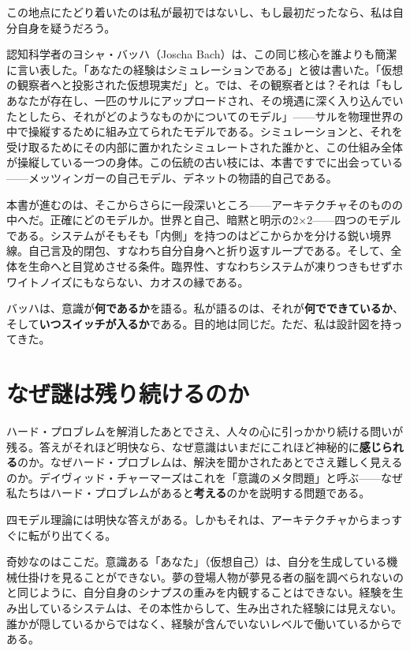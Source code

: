 \documentclass[11pt, twoside, openright]{book}
\begin{document}
この地点にたどり着いたのは私が最初ではないし、もし最初だったなら、私は自分自身を疑うだろう。

認知科学者のヨシャ・バッハ（Joscha Bach）は、この同じ核心を誰よりも簡潔に言い表した。「あなたの経験はシミュレーションである」と彼は書いた。「仮想の観察者へと投影された仮想現実だ」と。では、その観察者とは？それは「もしあなたが存在し、一匹のサルにアップロードされ、その境遇に深く入り込んでいたとしたら、それがどのようなものかについてのモデル」------サルを物理世界の中で操縦するために組み立てられたモデルである。シミュレーションと、それを受け取るためにその内部に置かれたシミュレートされた誰かと、この仕組み全体が操縦している一つの身体。この伝統の古い枝には、本書ですでに出会っている------メッツィンガーの自己モデル、デネットの物語的自己である。

本書が進むのは、そこからさらに一段深いところ------アーキテクチャそのものの中へだ。正確にどのモデルか。世界と自己、暗黙と明示の2×2------四つのモデルである。システムがそもそも「内側」を持つのはどこからかを分ける鋭い境界線。自己言及的閉包、すなわち自分自身へと折り返すループである。そして、全体を生命へと目覚めさせる条件。臨界性、すなわちシステムが凍りつきもせずホワイトノイズにもならない、カオスの縁である。

バッハは、意識が\textbf{何であるか}を語る。私が語るのは、それが\textbf{何でできているか}、そして\textbf{いつスイッチが入るか}である。目的地は同じだ。ただ、私は設計図を持ってきた。

\section*{なぜ謎は残り続けるのか}

ハード・プロブレムを解消したあとでさえ、人々の心に引っかかり続ける問いが残る。答えがそれほど明快なら、なぜ意識はいまだにこれほど神秘的に\textbf{感じられる}のか。なぜハード・プロブレムは、解決を聞かされたあとでさえ難しく見えるのか。デイヴィッド・チャーマーズはこれを「意識のメタ問題」と呼ぶ------なぜ私たちはハード・プロブレムがあると\textbf{考える}のかを説明する問題である。

四モデル理論には明快な答えがある。しかもそれは、アーキテクチャからまっすぐに転がり出てくる。

奇妙なのはここだ。意識ある「あなた」（仮想自己）は、自分を生成している機械仕掛けを見ることができない。夢の登場人物が夢見る者の脳を調べられないのと同じように、自分自身のシナプスの重みを内観することはできない。経験を生み出しているシステムは、その本性からして、生み出された経験には見えない。誰かが隠しているからではなく、経験が含んでいないレベルで働いているからである。
\end{document}
